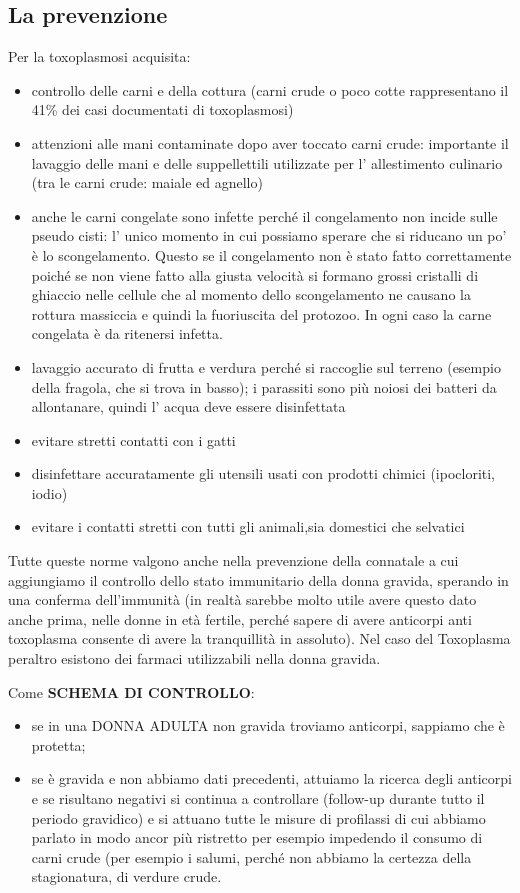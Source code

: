 \subsection{La prevenzione}
  Per la toxoplasmosi acquisita:
  \begin{itemize}
  
\item
  controllo delle carni e della cottura (carni crude o poco cotte
  rappresentano il 41\% dei casi documentati di toxoplasmosi)
\item
  attenzioni alle mani contaminate dopo aver toccato carni crude:
  importante il lavaggio delle mani e delle suppellettili utilizzate per
  l' allestimento culinario (tra le carni crude: maiale ed agnello)
\item
  anche le carni congelate sono infette perché il congelamento non
  incide sulle pseudo cisti: l' unico momento in cui possiamo sperare
  che si riducano un po' è lo scongelamento. Questo se il congelamento
  non è stato fatto correttamente poiché se non viene fatto alla giusta
  velocità si formano grossi cristalli di ghiaccio nelle cellule che al
  momento dello scongelamento ne causano la rottura massiccia e quindi
  la fuoriuscita del protozoo. In ogni caso la carne congelata è da
  ritenersi infetta.
\item
  lavaggio accurato di frutta e verdura perché si raccoglie sul terreno
  (esempio della fragola, che si trova in basso); i parassiti sono più
  noiosi dei batteri da allontanare, quindi l' acqua deve essere
  disinfettata
\item
  evitare stretti contatti con i gatti
\item
  disinfettare accuratamente gli utensili usati con prodotti chimici
  (ipocloriti, iodio)
\item
  evitare i contatti stretti con tutti gli animali,sia domestici che
  selvatici
  \end{itemize}

  Tutte queste norme valgono anche nella prevenzione della connatale a
  cui aggiungiamo il controllo dello stato immunitario della donna
  gravida, sperando in una conferma dell'immunità (in realtà sarebbe
  molto utile avere questo dato anche prima, nelle donne in età fertile,
  perché sapere di avere anticorpi anti toxoplasma consente di avere la
  tranquillità in assoluto). Nel caso del Toxoplasma peraltro esistono
  dei farmaci utilizzabili nella donna gravida.

  Come \textbf{SCHEMA DI CONTROLLO}:
  \begin{itemize}
  
\item
  se in una DONNA ADULTA non gravida troviamo anticorpi, sappiamo che è
  protetta;
\item
  se è gravida e non abbiamo dati precedenti, attuiamo la ricerca degli
  anticorpi e se risultano negativi si continua a controllare (follow-up
  durante tutto il periodo gravidico) e si attuano tutte le misure di
  profilassi di cui abbiamo parlato in modo ancor più ristretto per
  esempio impedendo il consumo di carni crude (per esempio i salumi,
  perché non abbiamo la certezza della stagionatura, di verdure crude.
  \end{itemize}


